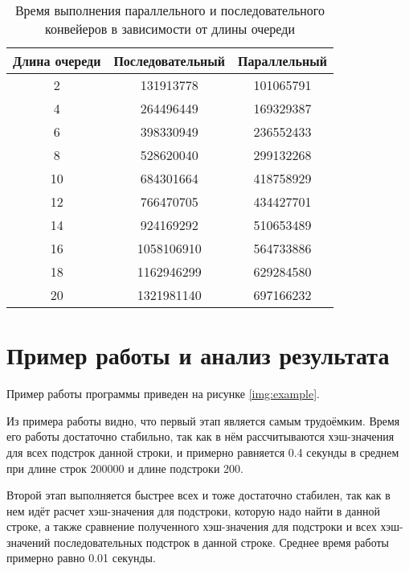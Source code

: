 \begin{table}[h]
    \caption{Время выполнения параллельного и последовательного конвейеров в зависимости от длины очереди}
    \label{tab:comp}
    \begin{center}
        \begin{tabular}{ |c|c|c| }
            \hline
            \textbf{Длина очереди} & \textbf{Последовательный} & \textbf{Параллельный} \\
            \hline
            2 & 131913778 & 101065791 \\
            \hline
            4 & 264496449 & 169329387 \\
            \hline
            6 & 398330949 & 236552433 \\
            \hline
            8 & 528620040 & 299132268 \\
            \hline
            10 & 684301664 & 418758929 \\
            \hline
            12 & 766470705 & 434427701 \\
            \hline
            14 & 924169292 & 510653489 \\
            \hline
            16 & 1058106910 & 564733886 \\
            \hline
            18 & 1162946299 & 629284580 \\
            \hline
            20 & 1321981140 & 697166232 \\
            \hline
        \end{tabular}
    \end{center}
\end{table}


\section{Пример работы и анализ результата}

Пример работы программы приведен на рисунке \ref{img:example}.
\clearpage
{}
\clearpage

Из примера работы видно, что первый этап является самым трудоёмким. Время его работы достаточно стабильно, так как в нём рассчитываются хэш-значения для всех подстрок данной строки, и примерно равняется 0.4 секунды в среднем при длине строк 200000 и длине подстроки 200.

Второй этап выполняется быстрее всех и тоже достаточно стабилен, так как в нем идёт расчет хэш-значения для подстроки, которую надо найти в данной строке, а также сравнение полученного хэш-значения для подстроки и всех хэш-значений последовательных подстрок в данной строке. Среднее время работы примерно равно 0.01 секунды.

